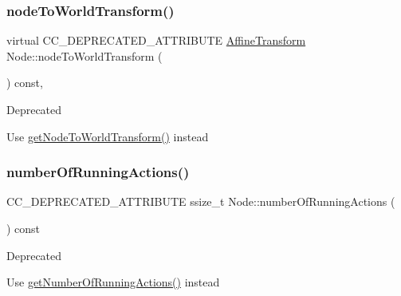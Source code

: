 \subsubsection{\texorpdfstring{node\+To\+World\+Transform()}{nodeToWorldTransform()}\hspace{0.1cm}{\footnotesize\ttfamily [2/2]}}
{\footnotesize\ttfamily virtual C\+C\+\_\+\+D\+E\+P\+R\+E\+C\+A\+T\+E\+D\+\_\+\+A\+T\+T\+R\+I\+B\+U\+TE \hyperlink{structAffineTransform}{Affine\+Transform} Node\+::node\+To\+World\+Transform (\begin{DoxyParamCaption}{ }\end{DoxyParamCaption}) const\hspace{0.3cm}{\ttfamily [inline]}, {\ttfamily [virtual]}}

\begin{DoxyRefDesc}{Deprecated}
\item[\hyperlink{deprecated__deprecated000265}{Deprecated}]Use \hyperlink{classNode_a1e46065101d0d5dba32262067d85bf23}{get\+Node\+To\+World\+Transform()} instead \end{DoxyRefDesc}
\mbox{\label{classNode_a7724086be31eda53304e6c9715f6fd21}} 
\subsubsection{\texorpdfstring{number\+Of\+Running\+Actions()}{numberOfRunningActions()}\hspace{0.1cm}{\footnotesize\ttfamily [1/2]}}
{\footnotesize\ttfamily C\+C\+\_\+\+D\+E\+P\+R\+E\+C\+A\+T\+E\+D\+\_\+\+A\+T\+T\+R\+I\+B\+U\+TE ssize\+\_\+t Node\+::number\+Of\+Running\+Actions (\begin{DoxyParamCaption}{ }\end{DoxyParamCaption}) const\hspace{0.3cm}{\ttfamily [inline]}}

\begin{DoxyRefDesc}{Deprecated}
\item[\hyperlink{deprecated__deprecated000032}{Deprecated}]Use \hyperlink{classNode_a576446fef9c35a1a06535eb8949df2f3}{get\+Number\+Of\+Running\+Actions()} instead \end{DoxyRefDesc}
\mbox{\label{classNode_a7724086be31eda53304e6c9715f6fd21}} 
